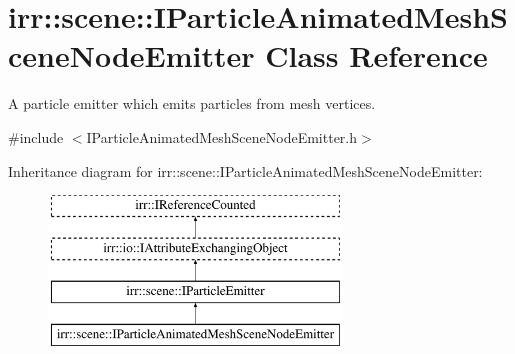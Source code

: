 \hypertarget{classirr_1_1scene_1_1IParticleAnimatedMeshSceneNodeEmitter}{}\section{irr\+:\+:scene\+:\+:I\+Particle\+Animated\+Mesh\+Scene\+Node\+Emitter Class Reference}
\label{classirr_1_1scene_1_1IParticleAnimatedMeshSceneNodeEmitter}


A particle emitter which emits particles from mesh vertices.  




{\ttfamily \#include $<$I\+Particle\+Animated\+Mesh\+Scene\+Node\+Emitter.\+h$>$}

Inheritance diagram for irr\+:\+:scene\+:\+:I\+Particle\+Animated\+Mesh\+Scene\+Node\+Emitter\+:\begin{figure}[H]
\begin{center}
\leavevmode
\includegraphics[height=4.000000cm]{classirr_1_1scene_1_1IParticleAnimatedMeshSceneNodeEmitter}
\end{center}
\end{figure}

